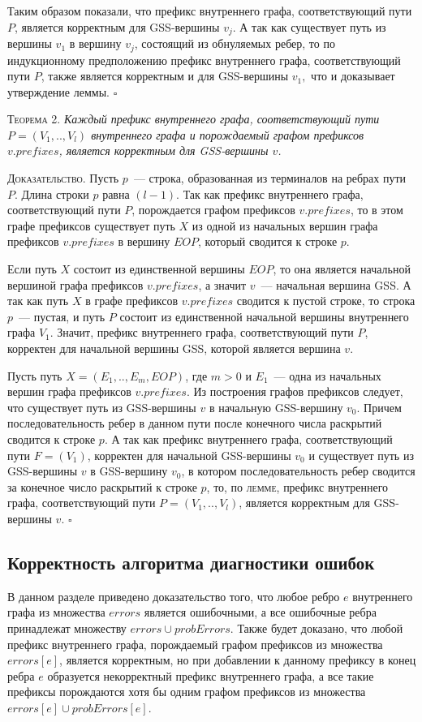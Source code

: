 Таким образом показали, что префикс внутреннего графа, соответствующий пути $P$, является корректным для GSS-вершины $v_{j}$. А так как существует путь из вершины $v_{1}$ в вершину $v_{j}$, состоящий из обнуляемых ребер, то по индукционному предположению префикс внутреннего графа, соответствующий пути $P$, также является корректным и для GSS-вершины $v_{1},$ что и доказывает утверждение леммы.
$\square$

\textsc{Теорема 2.} 
\textit{Каждый префикс внутреннего графа, соответствующий пути $P = (V_{1},..,V_{l})$ внутреннего графа и порождаемый графом префиксов $v.prefixes$, является корректным для GSS-вершины $v$.}

\textsc{Доказательство.}
Пусть $p$~--- строка, образованная из терминалов на ребрах пути $P$. Длина строки $p$ равна $(l-1)$. Так как префикс внутреннего графа, соответствующий пути $P$, порождается графом префиксов $v.prefixes$, то в этом графе префиксов существует путь $X$ из одной из начальных вершин графа префиксов $v.prefixes$ в вершину $EOP$, который сводится к строке $p$.

Если путь $X$ состоит из единственной вершины $EOP$, то она является начальной вершиной графа префиксов $v.prefixes$, а значит $v$~--- начальная вершина GSS. А так как путь $X$ в графе префиксов $v.prefixes$ сводится к пустой строке, то строка $p$~--- пустая, и путь $P$ состоит из единственной начальной вершины внутреннего графа $V_{1}$. Значит, префикс внутреннего графа, соответствующий пути $P$, корректен для начальной вершины GSS, которой является вершина $v$.

Пусть путь $X = (E_{1},..,E_{m},EOP)$, где $m > 0$ и $E_{1}$~--- одна из начальных вершин графа префиксов $v.prefixes$. Из построения графов префиксов следует, что существует путь из GSS-вершины $v$ в начальную GSS-вершину $v_{0}$. Причем последовательность ребер в данном пути после конечного числа раскрытий сводится к строке $p$. А так как префикс внутреннего графа, соответствующий пути $F = (V_{1})$, корректен для начальной GSS-вершины $v_{0}$ и существует путь из GSS-вершины $v$ в GSS-вершину $v_{0}$, в котором последовательность ребер сводится за конечное число раскрытий к строке $p$, то, по \textsc{лемме}, префикс внутреннего графа, соответствующий пути $P = (V_{1},..,V_{l})$, является корректным для GSS-вершины $v$.
$\square$

\subsection{Корректность алгоритма диагностики ошибок}
В данном разделе приведено доказательство того, что любое ребро $e$ внутреннего графа из множества $errors$ является ошибочными, а все ошибочные ребра принадлежат множеству $errors \cup probErrors$. Также будет доказано, что любой префикс внутреннего графа, порождаемый графом префиксов из множества $errors[e]$, является корректным, но при добавлении к данному префиксу в конец ребра $e$ образуется некорректный префикс внутреннего графа, а все такие префиксы порождаются хотя бы одним графом префиксов из множества $errors[e] \cup probErrors[e]$.

